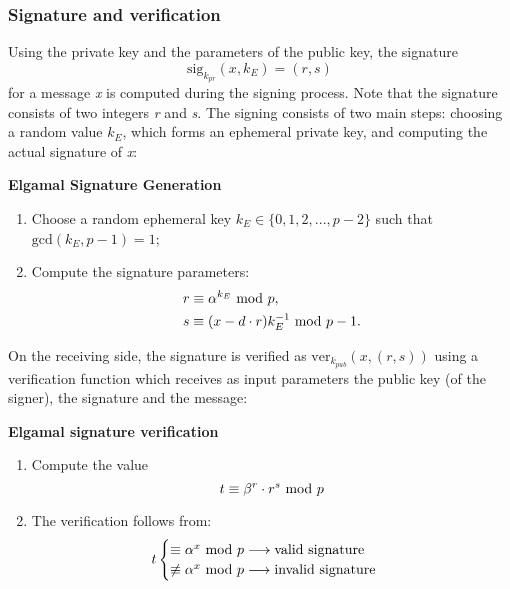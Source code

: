 \subsubsection{Signature and verification}
Using the private key and the parameters of the public key, the signature
$$\text{sig}_{k_{pr}}(x,k_E)=(r,s)$$
for a message \textit{x} is computed during the signing process. Note that the signature consists of two integers \textit{r} and \textit{s}. The signing consists of two main steps: choosing a random value $k_E$, which forms an ephemeral private key, and computing the actual signature of \textit{x}:
\begin{framed}
    \hfill\break\textbf{Elgamal Signature Generation}
    \begin{enumerate}
        \item Choose a random ephemeral key $k_E\in\{0,1,2,...,p-2\}$ such that $\text{gcd}(k_E,p-1)=1$;
        \item Compute the signature parameters:
        \begin{align*}
            &r\equiv\alpha^{k_E}\text{ mod } p,\\
            &s\equiv(x-d\cdot r)k_E^{-1}\text{ mod } p-1.
        \end{align*}
    \end{enumerate}
\end{framed}
On the receiving side, the signature is verified as $\text{ver}_{k_{pub}}(x, (r,s))$ using a verification function which receives as input parameters the public key (of the signer), the signature and the message:
\begin{framed}
    \hfill\break\textbf{Elgamal signature verification}
    \begin{enumerate}
        \item Compute the value
        $$t\equiv\beta^r\cdot r^s\text{ mod } p$$
        \item The verification follows from:
        \begin{equation*}
            t\begin{cases}
                \equiv\alpha^x\text{ mod } p\longrightarrow\text{valid signature}\\
                \not\equiv\alpha^x\text{ mod } p\longrightarrow\text{invalid signature}
            \end{cases}
        \end{equation*}
    \end{enumerate}
\end{framed}

\newpage
